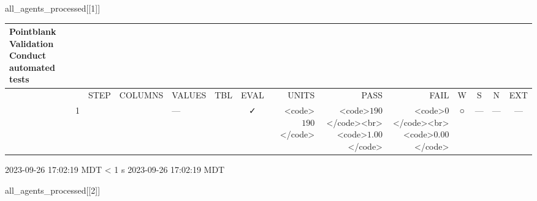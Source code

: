 \documentclass[
  letterpaper,
  DIV=11,
  numbers=noendperiod]{scrreprt}
\newenvironment{Shaded}{\begin{snugshade}}{\end{snugshade}}
\newcommand{\DecValTok}[1]{\textcolor[rgb]{0.68,0.00,0.00}{#1}}
\newcommand{\NormalTok}[1]{\textcolor[rgb]{0.00,0.23,0.31}{#1}}
\begin{document}
\begin{Shaded}
\begin{Highlighting}[]
\NormalTok{all\_agents\_processed[[}\DecValTok{1}\NormalTok{]]}
\end{Highlighting}
\end{Shaded}

\setlength{\LTpost}{0mm}
\begin{longtable}{lrlllccrrrcccc}
\caption*{
{\large Pointblank Validation} \\ 
{\small Conduct automated tests}
} \\ 
\toprule
 &  & STEP & COLUMNS & VALUES & TBL & EVAL & UNITS & PASS & FAIL & W & S & N & EXT \\ 
\midrule
 & 1 &  &  & — &                                                              & ✓ & <code>$190$</code> & <code>$190$</code><br><code>$1.00$</code> & <code>$0$</code><br><code>$0.00$</code> & ○ & --- & --- & --- \\ 
\bottomrule
\end{longtable}
\begin{minipage}{\linewidth}
2023-09-26 17:02:19 MDT
\textless{} 1 s
2023-09-26 17:02:19 MDT\\
\end{minipage}

\begin{Shaded}
\begin{Highlighting}[]
\NormalTok{all\_agents\_processed[[}\DecValTok{2}\NormalTok{]]}
\end{Highlighting}
\end{Shaded}
\end{document}
